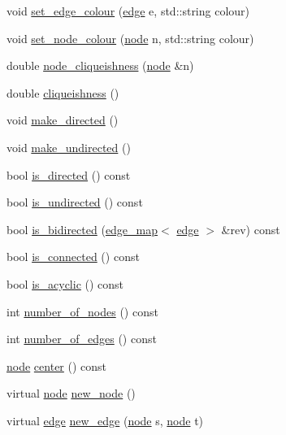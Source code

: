 \begin{DoxyCompactItemize}
\item 
void \mbox{\hyperlink{class_my_graph_a865b0e9fd7f74cd40f23230733746a93}{set\+\_\+edge\+\_\+colour}} (\mbox{\hyperlink{classedge}{edge}} e, std\+::string colour)
\item 
void \mbox{\hyperlink{class_my_graph_a4cada42859b2a657637e81eef7c6e4ab}{set\+\_\+node\+\_\+colour}} (\mbox{\hyperlink{classnode}{node}} n, std\+::string colour)
\item 
double \mbox{\hyperlink{class_my_graph_a513bec2f1949a01d517dd57cc9c30233}{node\+\_\+cliqueishness}} (\mbox{\hyperlink{classnode}{node}} \&n)
\item 
double \mbox{\hyperlink{class_my_graph_a2bb131d5401dc66c01acb976daa7e981}{cliqueishness}} ()
\item 
void \mbox{\hyperlink{classgraph_a1615678dee6248d6d8a00c553770b3bd}{make\+\_\+directed}} ()
\item 
void \mbox{\hyperlink{classgraph_a31c8b895bd842f1b9dcc67649956cfc7}{make\+\_\+undirected}} ()
\item 
bool \mbox{\hyperlink{classgraph_afc510be7479fa903fde9e0e615470ab0}{is\+\_\+directed}} () const
\item 
bool \mbox{\hyperlink{classgraph_aba427ff8ba0f70c68416ec1351344cd8}{is\+\_\+undirected}} () const
\item 
bool \mbox{\hyperlink{classgraph_a8014a8073dd640c91cbd4fc1fb6e6071}{is\+\_\+bidirected}} (\mbox{\hyperlink{classedge__map}{edge\+\_\+map}}$<$ \mbox{\hyperlink{classedge}{edge}} $>$ \&rev) const
\item 
bool \mbox{\hyperlink{classgraph_a599e2bf967df8a2052a9892c94db98b7}{is\+\_\+connected}} () const
\item 
bool \mbox{\hyperlink{classgraph_a9b500cb72826fe5bbefa8c71bc4642fa}{is\+\_\+acyclic}} () const
\item 
int \mbox{\hyperlink{classgraph_a42c78e0a9f115655e3ff0efe35ebfc4e}{number\+\_\+of\+\_\+nodes}} () const
\item 
int \mbox{\hyperlink{classgraph_aa4fcbe7bf572dc800068873ccfb4d95a}{number\+\_\+of\+\_\+edges}} () const
\item 
\mbox{\hyperlink{classnode}{node}} \mbox{\hyperlink{classgraph_a351617e023b4b6833ab650a70fc086e7}{center}} () const
\item 
virtual \mbox{\hyperlink{classnode}{node}} \mbox{\hyperlink{classgraph_ab9505335c20558319b6cce25aed23524}{new\+\_\+node}} ()
\item 
virtual \mbox{\hyperlink{classedge}{edge}} \mbox{\hyperlink{classgraph_a02a0c3a219f75d68caa408ef339d4a1c}{new\+\_\+edge}} (\mbox{\hyperlink{classnode}{node}} s, \mbox{\hyperlink{classnode}{node}} t)

\end{DoxyCompactItemize}
